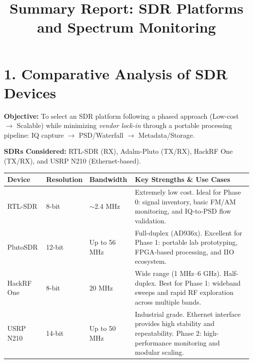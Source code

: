\documentclass[11pt]{report}
\title{Summary Report: SDR Platforms and Spectrum Monitoring}
\author{}
\date{}
\begin{document}
\maketitle

\section*{1. Comparative Analysis of SDR Devices}
\noindent\textbf{Objective:} To select an SDR platform following a phased approach (Low-cost $\rightarrow$ Scalable) while minimizing \emph{vendor lock-in} through a portable processing pipeline: IQ capture $\rightarrow$ PSD/Waterfall $\rightarrow$ Metadata/Storage.

\vspace{0.5em}
\noindent\textbf{SDRs Considered:} RTL-SDR (RX), Adalm-Pluto (TX/RX), HackRF One (TX/RX), and USRP N210 (Ethernet-based).

\begin{table}[h]
\centering
\small
\begin{tabularx}{\linewidth}{@{}l l l X@{}}
\toprule
\textbf{Device} & \textbf{Resolution} & \textbf{Bandwidth} & \textbf{Key Strengths \& Use Cases} \\
\midrule
RTL-SDR & 8-bit & $\sim$2.4 MHz & Extremely low cost. Ideal for Phase 0: signal inventory, basic FM/AM monitoring, and IQ-to-PSD flow validation. \\
\addlinespace
PlutoSDR & 12-bit & Up to 56 MHz & Full-duplex (AD936x). Excellent for Phase 1: portable lab prototyping, FPGA-based processing, and IIO ecosystem. \\
\addlinespace
HackRF One & 8-bit & 20 MHz & Wide range (1 MHz--6 GHz). Half-duplex. Best for Phase 1: wideband sweeps and rapid RF exploration across multiple bands. \\
\addlinespace
USRP N210 & 14-bit & Up to 50 MHz & Industrial grade. Ethernet interface provides high stability and repeatability. Phase 2: high-performance monitoring and modular scaling. \\
\bottomrule
\end{tabularx}
\end{table}
\end{document}
